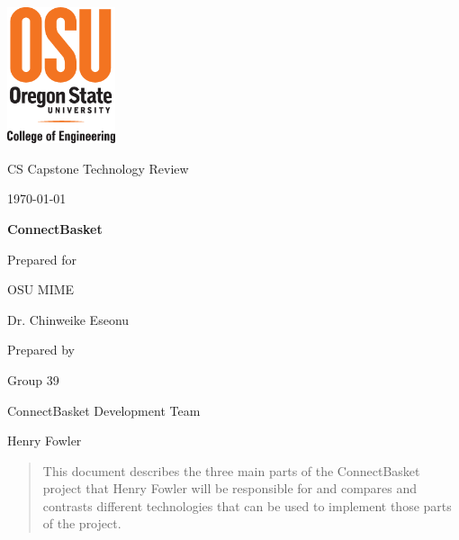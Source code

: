 \documentclass[onecolumn, draftclsnofoot,10pt, compsoc]{IEEEtran}
\def \CapstoneTeamName{		ConnectBasket Development Team}
\def \CapstoneTeamNumber{		39}
\def \GroupMemberOne{			Henry Fowler}
\def \CapstoneProjectName{		ConnectBasket}
\def \CapstoneSponsorCompany{	OSU MIME}
\def \CapstoneSponsorPerson{		Dr. Chinweike Eseonu}
\def \DocType{		%
				Technology Review
				}
\newcommand{\NameSigPair}[1]{\par
\makebox[2.75in][r]{#1} \hfil 	\makebox[3.25in]{\makebox[2.25in]{\hrulefill} \hfill		\makebox[.75in]{\hrulefill}}
\par\vspace{-12pt} \textit{\tiny\noindent
\makebox[2.75in]{} \hfil		\makebox[3.25in]{\makebox[2.25in][r]{Signature} \hfill	\makebox[.75in][r]{Date}}}}
\renewcommand{\NameSigPair}[1]{#1}
\begin{document}
\begin{titlepage}
    \begin{singlespace}
    	\includegraphics[height=4cm]{coe_v_spot1}
        \hfill 
        \par\vspace{.2in}
        \centering
        \scshape{
            \huge CS Capstone \DocType \par
            {\large\today}\par
            \vspace{.5in}
            \textbf{\Huge\CapstoneProjectName}\par
            \vfill
            {\large Prepared for}\par
            \Huge \CapstoneSponsorCompany\par
            \vspace{5pt}
            {\Large\NameSigPair{\CapstoneSponsorPerson}\par}
            {\large Prepared by }\par
            Group\CapstoneTeamNumber\par
            \CapstoneTeamName\par 
            \vspace{5pt}
            {\Large
                \NameSigPair{\GroupMemberOne}\par
            }
            \vspace{20pt}
        }
        \begin{abstract}
        This document describes the three main parts of the ConnectBasket project that Henry Fowler will be responsible for and compares and contrasts different technologies that can be used to implement those parts of the project.
        \end{abstract}     
    \end{singlespace}
\end{titlepage}
\newpage
{}
\tableofcontents
\clearpage
\end{document}
